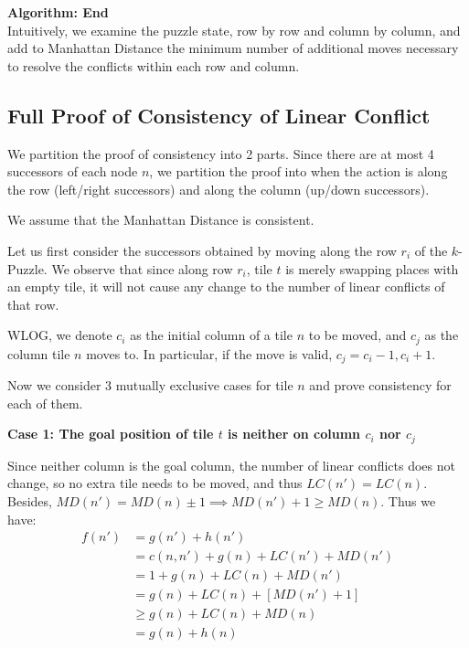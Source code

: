 \documentclass{llncs}
\begin{document}
\textbf{Algorithm: End} \\

Intuitively, we examine the puzzle state, row by row and column by column, and add to Manhattan Distance the minimum number of additional moves
necessary to resolve the conflicts within each row and column.

\subsection{Full Proof of Consistency of Linear Conflict}
We partition the proof of consistency into 2 parts. Since there are at most 4 successors of each node $n$, we partition the proof into when the action is along the row (left/right successors) and along the column (up/down successors).

We assume that the Manhattan Distance is consistent.

Let us first consider the successors obtained by moving along the row $r_i$ of the $k$-Puzzle. We observe that since along row $r_i$, tile $t$ is merely swapping places with an empty tile, it will not cause any change to the number of linear conflicts of that row.

WLOG, we denote $c_i$ as the initial column of a tile $n$ to be moved, and $c_j$ as the column tile $n$ moves to. In particular, if the move is valid, $c_j = c_i - 1, c_i + 1$.

Now we consider 3 mutually exclusive cases for tile $n$ and prove consistency for each of them.

\textbf{Case 1: The goal position of tile $t$ is neither on column $c_i$ nor $c_j$}

Since neither column is the goal column, the number of linear conflicts does not change, so no extra tile needs to be moved, and thus $LC(n') = LC(n)$. Besides, $MD(n') = MD(n) \pm 1 \implies MD(n') + 1 \geq MD(n)$. Thus we have:
\begin{align}
    f(n') \nonumber
    	&= g(n') + h(n') \\\nonumber
        &= c(n,n') + g(n) + LC(n') + MD(n') \\\nonumber
        &= 1 + g(n) + LC(n) + MD(n') \\\nonumber
        &= g(n) + LC(n) + [MD(n') + 1] \\\nonumber
        &\geq g(n) + LC(n) + MD(n) \\\nonumber
        &= g(n) + h(n) \\\nonumber
\end{align}
\end{document}
